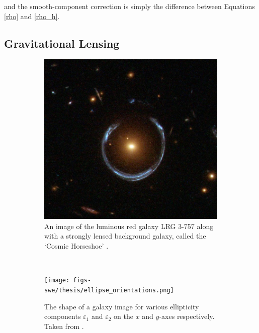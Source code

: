 \documentclass[%
 reprint,
 amsmath,amssymb,
 aps,nofootinbib
]{revtex4-1}
\begin{document}
\noindent and the smooth-component correction is simply the difference between Equations \eqref{rho} and \eqref{rho_h}.


\subsection{Gravitational Lensing} \label{grav_lensing}

\begin{figure}
    \centering
    \begin{subfigure}[H]{0.425\textwidth}
        \includegraphics[width=\textwidth]{figs-swe/thesis/einstein_ring.png}
        \captionsetup{justification=raggedright,singlelinecheck=false}
        \caption{An image of the luminous red galaxy LRG 3-757 along with a strongly lensed background galaxy, called the `Cosmic Horseshoe' \cite{einstein_ring}.}
        \label{einstein_ring}
    \end{subfigure}
    ~
    \begin{subfigure}[H]{0.415\textwidth}
        \texttt{[image: figs-swe/thesis/ellipse\_orientations.png]}
        \captionsetup{justification=raggedright,singlelinecheck=false}
        \caption{The shape of a galaxy image for various ellipticity components $\varepsilon_1$ and $\varepsilon_2$ on the $x$ and $y$-axes respectively. Taken from \cite{schneider}.}
        \label{ellipses}
    \end{subfigure}
    \caption{}
\end{figure}
\end{document}
